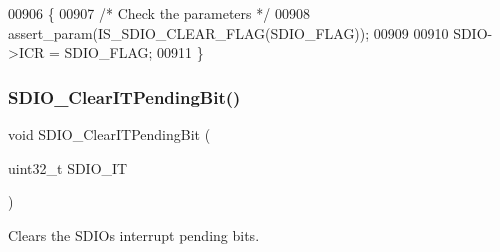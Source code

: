 \begin{DoxyCode}
00906 \{ 
00907   \textcolor{comment}{/* Check the parameters */}
00908   assert_param(IS_SDIO_CLEAR_FLAG(SDIO\_FLAG));
00909    
00910   SDIO->ICR = SDIO\_FLAG;
00911 \}
\end{DoxyCode}
\mbox{\label{group__SDIO__Group7_ga048e07fd86321cd01b2a22c071c3149b}} 
\subsubsection{S\+D\+I\+O\+\_\+\+Clear\+I\+T\+Pending\+Bit()}
{\footnotesize\ttfamily void S\+D\+I\+O\+\_\+\+Clear\+I\+T\+Pending\+Bit (\begin{DoxyParamCaption}\item[{uint32\+\_\+t}]{S\+D\+I\+O\+\_\+\+IT }\end{DoxyParamCaption})}



Clears the S\+D\+IO\textquotesingle{}s interrupt pending bits. 


